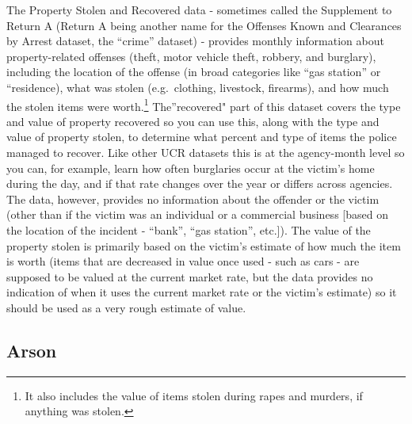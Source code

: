 \documentclass[
  12pt,
  openany]{book}
\begin{document}
The Property Stolen and Recovered data - sometimes called the Supplement to Return A (Return A being another name for the Offenses Known and Clearances by Arrest dataset, the ``crime'' dataset) - provides monthly information about property-related offenses (theft, motor vehicle theft, robbery, and burglary), including the location of the offense (in broad categories like ``gas station'' or ``residence), what was stolen (e.g.~clothing, livestock, firearms), and how much the stolen items were worth.\footnote{It also includes the value of items stolen during rapes and murders, if anything was stolen.} The''recovered" part of this dataset covers the type and value of property recovered so you can use this, along with the type and value of property stolen, to determine what percent and type of items the police managed to recover. Like other UCR datasets this is at the agency-month level so you can, for example, learn how often burglaries occur at the victim's home during the day, and if that rate changes over the year or differs across agencies. The data, however, provides no information about the offender or the victim (other than if the victim was an individual or a commercial business {[}based on the location of the incident - ``bank'', ``gas station'', etc.{]}). The value of the property stolen is primarily based on the victim's estimate of how much the item is worth (items that are decreased in value once used - such as cars - are supposed to be valued at the current market rate, but the data provides no indication of when it uses the current market rate or the victim's estimate) so it should be used as a very rough estimate of value.

\hypertarget{arson}{%
\subsection{Arson}\label{arson}}
\end{document}
